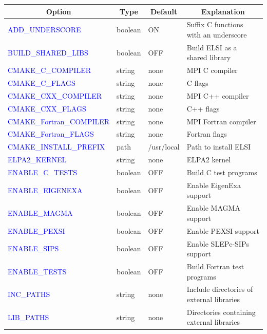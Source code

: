 \documentclass{report}
\newcommand{\tcb}[1]{\textcolor{blue}{#1}}
\begin{document}
\begin{tabular}[]{|p{50mm}|p{15mm}|p{20mm}|p{80mm}|}
\hline
\multicolumn{1}{|c|}{\textbf{Option}} & \multicolumn{1}{c|}{\textbf{Type}} & \multicolumn{1}{c|}{\textbf{Default}} & \multicolumn{1}{c|}{\textbf{Explanation}}\\
\hline
\tcb{ADD\_UNDERSCORE}          & boolean & ON          & Suffix C functions with an underscore\\
\hline
\tcb{BUILD\_SHARED\_LIBS}      & boolean & OFF         & Build ELSI as a shared library\\
\hline
\tcb{CMAKE\_C\_COMPILER}       & string  & none        & MPI C compiler\\
\hline
\tcb{CMAKE\_C\_FLAGS}          & string  & none        & C flags\\
\hline
\tcb{CMAKE\_CXX\_COMPILER}     & string  & none        & MPI C++ compiler\\
\hline
\tcb{CMAKE\_CXX\_FLAGS}        & string  & none        & C++ flags\\
\hline
\tcb{CMAKE\_Fortran\_COMPILER} & string  & none        & MPI Fortran compiler\\
\hline
\tcb{CMAKE\_Fortran\_FLAGS}    & string  & none        & Fortran flags\\
\hline
\tcb{CMAKE\_INSTALL\_PREFIX}   & path    & /usr/local  & Path to install ELSI\\
\hline
\tcb{ELPA2\_KERNEL}            & string  & none        & ELPA2 kernel\\
\hline
\tcb{ENABLE\_C\_TESTS}         & boolean & OFF         & Build C test programs\\
\hline
\tcb{ENABLE\_EIGENEXA}         & boolean & OFF         & Enable EigenExa support\\
\hline
\tcb{ENABLE\_MAGMA}            & boolean & OFF         & Enable MAGMA support\\
\hline
\tcb{ENABLE\_PEXSI}            & boolean & OFF         & Enable PEXSI support\\
\hline
\tcb{ENABLE\_SIPS}             & boolean & OFF         & Enable SLEPc-SIPs support\\
\hline
\tcb{ENABLE\_TESTS}            & boolean & OFF         & Build Fortran test programs\\
\hline
\tcb{INC\_PATHS}               & string  & none        & Include directories of external libraries\\
\hline
\tcb{LIB\_PATHS}               & string  & none        & Directories containing external libraries\\

\end{tabular}
\end{document}
